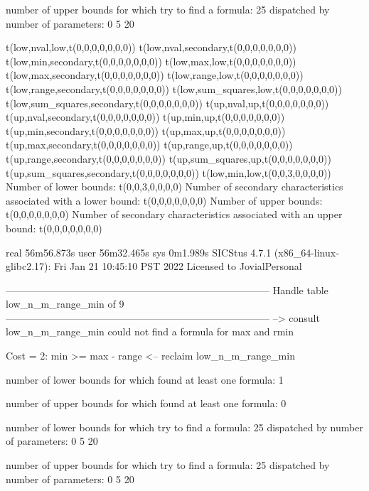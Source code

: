 number of upper bounds for which try to find a formula: 25
dispatched by number of parameters: 0  5  20

t(low,nval,low,t(0,0,0,0,0,0,0))
t(low,nval,secondary,t(0,0,0,0,0,0,0))
t(low,min,secondary,t(0,0,0,0,0,0,0))
t(low,max,low,t(0,0,0,0,0,0,0))
t(low,max,secondary,t(0,0,0,0,0,0,0))
t(low,range,low,t(0,0,0,0,0,0,0))
t(low,range,secondary,t(0,0,0,0,0,0,0))
t(low,sum_squares,low,t(0,0,0,0,0,0,0))
t(low,sum_squares,secondary,t(0,0,0,0,0,0,0))
t(up,nval,up,t(0,0,0,0,0,0,0))
t(up,nval,secondary,t(0,0,0,0,0,0,0))
t(up,min,up,t(0,0,0,0,0,0,0))
t(up,min,secondary,t(0,0,0,0,0,0,0))
t(up,max,up,t(0,0,0,0,0,0,0))
t(up,max,secondary,t(0,0,0,0,0,0,0))
t(up,range,up,t(0,0,0,0,0,0,0))
t(up,range,secondary,t(0,0,0,0,0,0,0))
t(up,sum_squares,up,t(0,0,0,0,0,0,0))
t(up,sum_squares,secondary,t(0,0,0,0,0,0,0))
t(low,min,low,t(0,0,3,0,0,0,0))
Number of lower bounds:                                             t(0,0,3,0,0,0,0)
Number of secondary characteristics associated with a lower bound:  t(0,0,0,0,0,0,0)
Number of upper bounds:                                             t(0,0,0,0,0,0,0)
Number of secondary characteristics associated with an upper bound: t(0,0,0,0,0,0,0)

real	56m56.873s
user	56m32.465s
sys	0m1.989s
SICStus 4.7.1 (x86_64-linux-glibc2.17): Fri Jan 21 10:45:10 PST 2022
Licensed to JovialPersonal


--------------------------------------------------------------------------------
Handle table low_n_m_range_min of 9
--------------------------------------------------------------------------------
--> consult low_n_m_range_min
could not find a formula for max and rmin

Cost =  2:  min >= max - range
<-- reclaim low_n_m_range_min

number of lower bounds for which found at least one formula: 1

number of upper bounds for which found at least one formula: 0

number of lower bounds for which try to find a formula: 25
dispatched by number of parameters: 0  5  20

number of upper bounds for which try to find a formula: 25
dispatched by number of parameters: 0  5  20

